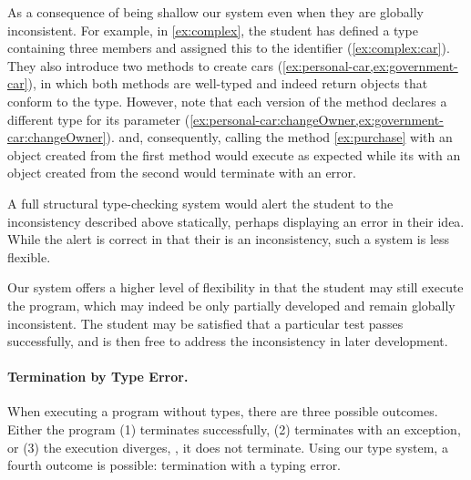 As a consequence of being shallow our system  even when they are globally inconsistent.
For example, in \cref{ex:complex}, the student has defined a type containing
three members and assigned this to the identifier  (\cref{ex:complex:car}).
They also introduce two methods to create cars 
(\cref{ex:personal-car,ex:government-car}),
in which both methods are well-typed and indeed return objects that conform to
the  type.
However, note that each version of the  method
declares a different type for its parameter
(\cref{ex:personal-car:changeOwner,ex:government-car:changeOwner}).
and, consequently, calling the 
 method \cref{ex:purchase} with
an object created from the first method would execute as expected
while its with an object created from the second would terminate with
an error. 

A full structural type-checking system would alert the student to 
the inconsistency described above statically,
perhaps displaying an error in their idea. 
While the alert is correct in that their is an inconsistency,
such a system is less flexible. 

Our system offers a higher level of flexibility in that the student
may still execute the program, 
which may indeed be only partially developed and remain globally inconsistent.
The student may be satisfied that a particular test passes successfully, and
is then free to address the inconsistency in later development.


\paragraph{Termination by Type Error.}

When executing a program without types, there are three possible outcomes.
Either the program (1) terminates successfully,
(2) terminates with an exception, or 
(3) the execution diverges, \ie, it does not terminate.
Using our type system, a
fourth outcome is possible: termination with a typing error.

